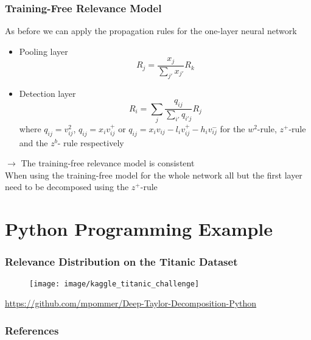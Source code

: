 \documentclass{beamer}
\begin{document}
\begin{frame}
\frametitle{Training-Free Relevance Model}
\vspace{0.25cm}
As before we can apply the propagation rules for the one-layer neural network
\begin{itemize}
\item Pooling layer
\begin{equation*}
R_j = \frac{x_j}{\sum_{j'} x_{j'}}R_k
\end{equation*}

\item Detection layer
\begin{equation*}
R_i = \sum_j \frac{q_{ij}}{\sum_{i'} q_{i'j}} R_j
\end{equation*}
where $q_{ij}= v_{ij}^2$, $q_{ij}= x_i v_{ij}^+$ or $q_{ij}= x_i v_{ij} - l_i v_{ij}^+ - h_i v_{ij}^-$ for the $w^2$-rule, $z^+$-rule and the $z^b$- rule respectively
\end{itemize}
\vspace{0.1cm}
$\rightarrow$ The training-free relevance model is consistent\\

\vspace{0.5cm}
When using the training-free model for the whole network all but the first layer need to be decomposed using the $z^+$-rule
\end{frame}


\section{Python Programming Example}

\begin{frame}
\frametitle{Relevance Distribution on the Titanic Dataset}
\vspace{0.5cm}
\begin{figure}
\texttt{[image: image/kaggle\_titanic\_challenge]}
\end{figure}
\vspace{0.25cm}
\url{https://github.com/mpommer/Deep-Taylor-Decomposition-Python}
\end{frame}


\begin{frame}[allowframebreaks]
\frametitle{References}
\printbibliography
\end{frame}
\end{document}
